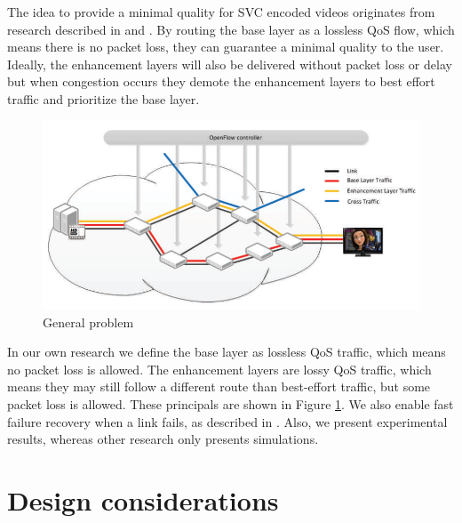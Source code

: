 \documentclass[conference]{IEEEtran}
\begin{document}
The idea to provide a minimal quality for SVC encoded videos originates from 
research described in \cite{egilmez2011scalable} and \cite{civanlar2010qos}. 
By routing the base layer as a lossless QoS flow, which means there is no packet loss, they can 
guarantee a minimal quality to the user. Ideally, the enhancement layers will also be delivered 
without packet loss or delay but when congestion occurs they demote the enhancement layers to best 
effort traffic and prioritize the base layer.

\begin{figure}[htb]
\centering
\includegraphics[width=\linewidth]{fig/SVC_OpenFlow_flow}
\caption{General problem}
\label{fig_sim}
\end{figure}

In our own research we define the base layer as lossless QoS traffic, which means no packet loss is allowed.
The enhancement layers are lossy QoS traffic, which means they may still follow a different 
route than best-effort traffic, but some packet loss is allowed.
These principals are shown in Figure \ref{fig_sim}.
We also enable fast failure recovery when a link fails, as described in \cite{sharma2011enabling}.
Also, we present experimental results, whereas other research only presents simulations.

\section{Design considerations}
\end{document}
